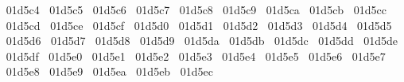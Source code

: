 {  ^^^^^^01d5c4%
  ^^^^^^01d5c5%
  ^^^^^^01d5c6%
  ^^^^^^01d5c7%
  ^^^^^^01d5c8%
  ^^^^^^01d5c9%
  ^^^^^^01d5ca%
  ^^^^^^01d5cb%
  ^^^^^^01d5cc%
  ^^^^^^01d5cd%
  ^^^^^^01d5ce%
  ^^^^^^01d5cf%
  ^^^^^^01d5d0%
  ^^^^^^01d5d1%
  ^^^^^^01d5d2%
  ^^^^^^01d5d3%
  ^^^^^^01d5d4%
  ^^^^^^01d5d5%
  ^^^^^^01d5d6%
  ^^^^^^01d5d7%
  ^^^^^^01d5d8%
  ^^^^^^01d5d9%
  ^^^^^^01d5da%
  ^^^^^^01d5db%
  ^^^^^^01d5dc%
  ^^^^^^01d5dd%
  ^^^^^^01d5de%
  ^^^^^^01d5df%
  ^^^^^^01d5e0%
  ^^^^^^01d5e1%
  ^^^^^^01d5e2%
  ^^^^^^01d5e3%
  ^^^^^^01d5e4%
  ^^^^^^01d5e5%
  ^^^^^^01d5e6%
  ^^^^^^01d5e7%
  ^^^^^^01d5e8%
  ^^^^^^01d5e9%
  ^^^^^^01d5ea%
  ^^^^^^01d5eb%
  ^^^^^^01d5ec%
}
